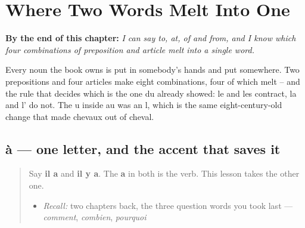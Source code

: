 
\chapter{Where Two Words Melt Into One}
\label{ch:fr-contractions}

\begin{chapteropening}
\textbf{By the end of this chapter:} \emph{I can say to, at, of and from, and I know which four combinations of preposition and article melt into a single word.}

Every noun the book owns is put in somebody's hands and put somewhere. Two prepositions and four articles make eight combinations, four of which melt -- and the rule that decides which is the one du already showed: le and les contract, la and l' do not. The u inside au was an l, which is the same eight-century-old change that made chevaux out of cheval.
\end{chapteropening}

\section[à]{à — one letter, and the accent that saves it}

\label{lesson:FR-C35-a}



\begin{quote}
Say \textbf{il a} and \textbf{il y a}. The \textbf{a} in both is the verb. This lesson takes the other one.

\begin{itemize}
\raggedright
  \item \emph{Recall:} two chapters back, the three question words you took last — \emph{comment}, \emph{combien}, \emph{pourquoi}
\end{itemize}
\end{quote}

